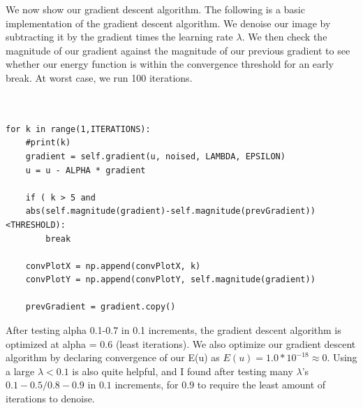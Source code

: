\documentclass[12pt]{article}
\begin{document}
\noindent We now show our gradient descent algorithm. The following is a basic implementation of the gradient descent algorithm. We denoise our image by subtracting it by the gradient times the learning rate $\lambda$. We then check the magnitude of our gradient against the magnitude of our previous gradient to see whether our energy function is within the convergence threshold for an early break. At worst case, we run 100 iterations. \\
\pagebreak\\\\
\begin{mdframed}[backgroundcolor=bg]
\begin{verbatim}
for k in range(1,ITERATIONS):
    #print(k)
    gradient = self.gradient(u, noised, LAMBDA, EPSILON)
    u = u - ALPHA * gradient
    
    if ( k > 5 and 
    abs(self.magnitude(gradient)-self.magnitude(prevGradient))<THRESHOLD):
        break

    convPlotX = np.append(convPlotX, k)
    convPlotY = np.append(convPlotY, self.magnitude(gradient))
    
    prevGradient = gradient.copy()

\end{verbatim}
\end{mdframed}
\;
\;

\noindent After testing alpha 0.1-0.7 in 0.1 increments, the gradient descent algorithm is optimized at alpha = 0.6 (least iterations). We also optimize our gradient descent algorithm by declaring convergence of our E(u) as $E(u) = 1.0*10^{-18}  \approx  0$. Using a large $ \lambda < 0.1$ is also quite helpful, and I found after testing many $\lambda$'s $0.1-0.5/0.8-0.9$ in $0.1$ increments, for $0.9$ to require the least amount of iterations to denoise.\\
\end{document}
